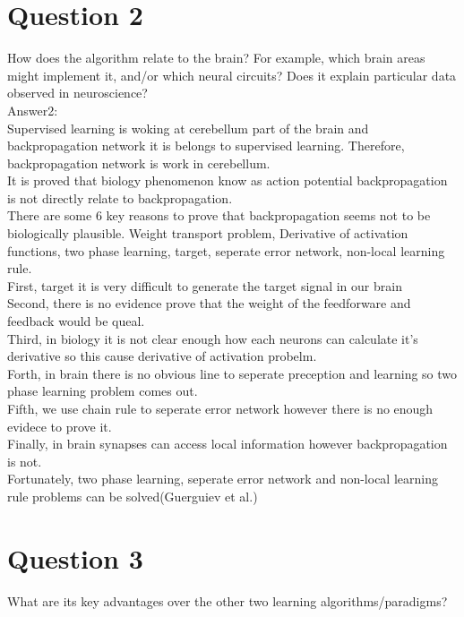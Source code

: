 \documentclass[12pt]{article}
\begin{document}
\section{Question 2}
How does the algorithm relate to the brain? For example, which brain areas might implement it, and/or which neural circuits? Does it explain particular data observed in neuroscience?\\

Answer2:\\
Supervised learning is woking at cerebellum part of the brain and backpropagation network it is belongs to supervised learning.
Therefore, backpropagation network is work in cerebellum.\\
It is proved that biology phenomenon know as action potential backpropagation is not directly relate to backpropagation.\\
There are some 6 key reasons to prove that backpropagation seems not to be biologically plausible. Weight transport problem, Derivative of activation functions, two phase learning, target, seperate error network, non-local learning rule.\\
First, target it is very difficult to generate the target signal in our brain \\
Second, there is no evidence prove that the weight of the feedforware and feedback would be queal.\\
Third, in biology it is not clear enough how each neurons can calculate it's derivative so this cause derivative of activation probelm.\\
Forth, in brain there is no obvious line to seperate preception and learning so two phase learning problem comes out.\\
Fifth, we use chain rule to seperate error network however there is no enough evidece to prove it.\\
Finally, in brain synapses can access local information however backpropagation is not.\\
Fortunately, two phase learning, seperate error network and non-local learning rule problems can be solved(Guerguiev et al.)\\



\section{Question 3}
What are its key advantages over the other two learning algorithms/paradigms?\\
\end{document}
